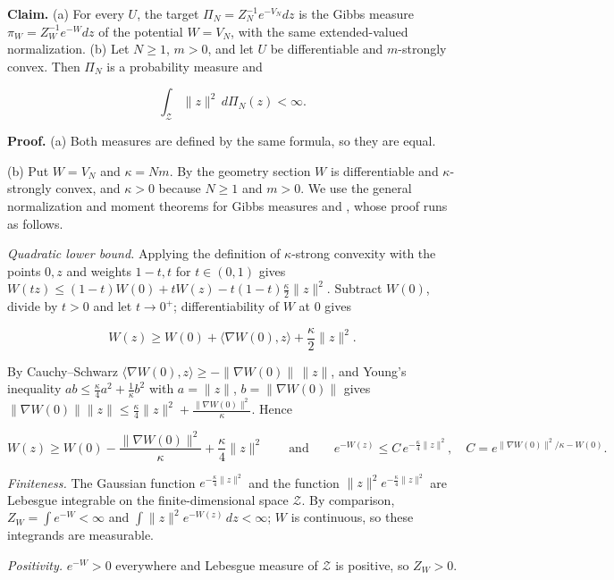 \documentclass[11pt,a4paper]{article}
\begin{document}
\textbf{Claim.} (a) For every \(U\), the target \(\Pi_N=Z_N^{-1}e^{-V_N}dz\) is the Gibbs measure \(\pi_W=Z_W^{-1}e^{-W}dz\) of the potential \(W=V_N\), with the same extended-valued normalization. (b) Let \(N\ge1\), \(m>0\), and let \(U\) be differentiable and \(m\)-strongly convex. Then \(\Pi_N\) is a probability measure and


\[\int_{\mathcal Z}\|z\|^2\,d\Pi_N(z)<\infty .\]


\textbf{Proof.} (a) Both measures are defined by the same formula, so they are equal.




(b) Put \(W=V_N\) and \(\kappa=Nm\). By the geometry section \(W\) is differentiable and \(\kappa\)-strongly convex, and \(\kappa>0\) because \(N\ge1\) and \(m>0\). We use the general normalization and moment theorems for Gibbs measures \cite[Section~3.26.13]{LangevinLean2026ULASC} and \cite[Section~3.26.15]{LangevinLean2026ULASC}, whose proof runs as follows.




\emph{Quadratic lower bound.} Applying the definition of \(\kappa\)-strong convexity with the points \(0,z\) and weights \(1-t,t\) for \(t\in(0,1)\) gives \(W(tz)\le(1-t)W(0)+tW(z)-t(1-t)\frac\kappa2\|z\|^2\). Subtract \(W(0)\), divide by \(t>0\) and let \(t\to0^+\); differentiability of \(W\) at \(0\) gives


\[W(z)\ge W(0)+\langle\nabla W(0),z\rangle+\frac\kappa2\|z\|^2 .\]


By Cauchy–Schwarz \(\langle\nabla W(0),z\rangle\ge-\|\nabla W(0)\|\,\|z\|\), and Young's inequality \(ab\le\frac\kappa4a^2+\frac1\kappa b^2\) with \(a=\|z\|\), \(b=\|\nabla W(0)\|\) gives \(\|\nabla W(0)\|\|z\|\le\frac\kappa4\|z\|^2+\frac{\|\nabla W(0)\|^2}\kappa\). Hence


\[W(z)\ge W(0)-\frac{\|\nabla W(0)\|^2}\kappa+\frac\kappa4\|z\|^2\qquad\text{and}\qquad e^{-W(z)}\le C\,e^{-\frac\kappa4\|z\|^2},\quad C=e^{\|\nabla W(0)\|^2/\kappa-W(0)} .\]


\emph{Finiteness.} The Gaussian function \(e^{-\frac\kappa4\|z\|^2}\) and the function \(\|z\|^2e^{-\frac\kappa4\|z\|^2}\) are Lebesgue integrable on the finite-dimensional space \(\mathcal Z\). By comparison, \(Z_W=\int e^{-W}<\infty\) and \(\int\|z\|^2e^{-W(z)}\,dz<\infty\); \(W\) is continuous, so these integrands are measurable.




\emph{Positivity.} \(e^{-W}>0\) everywhere and Lebesgue measure of \(\mathcal Z\) is positive, so \(Z_W>0\).
\end{document}
